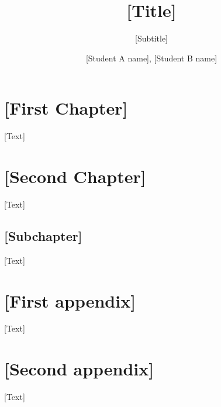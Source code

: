 \documentclass[11pt, a4paper]{resources/JTH}
\title{[Title]}
\subtitle{[Subtitle]}
\author{[Student A name], [Student B name]}
\begin{document}
\maketitle


\begingroup
    \setlength{\parskip}{0pt} %
    \tableofcontents
\endgroup

\newpage


\section{[First Chapter]}

    [Text]

\section{[Second Chapter]}
    
    [Text]

    \subsection{[Subchapter]}

        [Text]

\newpage
\printbibliography

\newpage
\begin{appendices} %

\section{[First appendix]}

    [Text]
    
\section{[Second appendix]}

    [Text]

\end{appendices}
\end{document}
